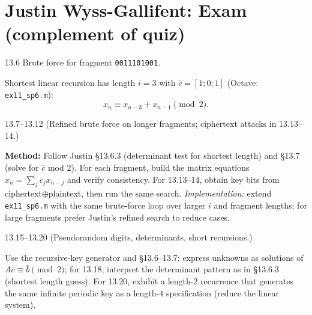 \section*{Justin Wyss-Gallifent: Exam (complement of quiz)}

\begin{exercise}{13.6}
Brute force for fragment \texttt{0011101001}.
\end{exercise}
\begin{solution}
Shortest linear recursion has length $i=3$ with $\bar{c}=[1;0;1]$ (Octave: \texttt{ex11\_sp6.m}):
\[
x_n \equiv x_{n-3} + x_{n-1} \pmod 2.
\]
\end{solution}

\begin{exercise}{13.7--13.12}
(Refined brute force on longer fragments; ciphertext attacks in 13.13--14.)
\end{exercise}
\begin{solution}
\textbf{Method:} Follow Justin \S13.6.3 (determinant test for shortest length) and \S13.7 (solve for $\bar{c}$ mod $2$). For each fragment, build the matrix equations $x_{n}=\sum_{j}c_j x_{n-j}$ and verify consistency. For 13.13--14, obtain key bits from ciphertext$\oplus$plaintext, then run the same search. \textit{Implementation:} extend \texttt{ex11\_sp6.m} with the same brute-force loop over larger $i$ and fragment lengths; for large fragments prefer Justin's refined search to reduce cases.
\end{solution}

\begin{exercise}{13.15--13.20}
(Pseudorandom digits, determinants, short recursions.)
\end{exercise}
\begin{solution}
Use the recursive-key generator and \S13.6--13.7: express unknowns as solutions of $A\bar{c}\equiv\bar{b}\pmod 2$; for 13.18, interpret the determinant pattern as in \S13.6.3 (shortest length guess). For 13.20, exhibit a length-$2$ recurrence that generates the same infinite periodic key as a length-$4$ specification (reduce the linear system).
\end{solution}
